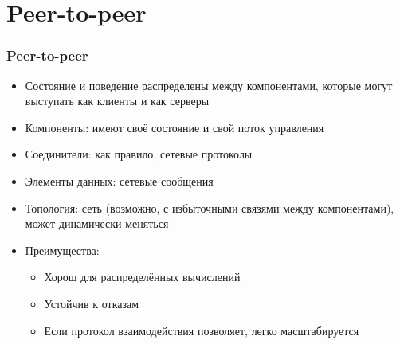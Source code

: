 \documentclass{../cscslides}
\begin{document}
    \section{Peer-to-peer}

    \begin{frame}
        \frametitle{Peer-to-peer}
        \begin{itemize}
            \item Состояние и поведение распределены между компонентами, которые могут выступать как клиенты и как серверы
            \item Компоненты: имеют своё состояние и свой поток управления
            \item Соединители: как правило, сетевые протоколы
            \item Элементы данных: сетевые сообщения
            \item Топология: сеть (возможно, с избыточными связями между компонентами), может динамически меняться
            \item Преимущества:
            \begin{itemize}
                \item Хорош для распределённых вычислений
                \item Устойчив к отказам
                \item Если протокол взаимодействия позволяет, легко масштабируется
            \end{itemize}
        \end{itemize}
    \end{frame}
\end{document}
